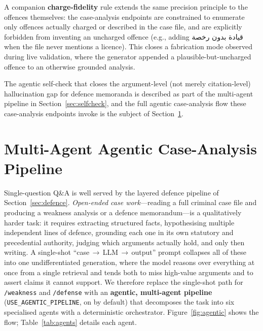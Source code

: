 \documentclass[final,1p,times]{elsarticle}
\newcommand{\ar}[1]{{\arabicfont\beginR #1\endR}}
\begin{document}
A companion \textbf{charge-fidelity} rule extends the same precision
principle to the offences themselves: the case-analysis endpoints are
constrained to enumerate only offences actually charged or described in the
case file, and are explicitly forbidden from inventing an uncharged offence
(e.g., adding \ar{قيادة بدون رخصة} when the file never mentions a licence).
This closes a fabrication mode observed during live validation, where the
generator appended a plausible-but-uncharged offence to an otherwise
grounded analysis.

The agentic self-check that closes the argument-level (not merely
citation-level) hallucination gap for defence memoranda is described as part of
the multi-agent pipeline in Section~\ref{sec:selfcheck}, and the full agentic
case-analysis flow these case-analysis endpoints invoke is the subject of
Section~\ref{sec:agentic}.

\section{Multi-Agent Agentic Case-Analysis Pipeline}\label{sec:agentic}

Single-question Q\&A is well served by the layered defence pipeline of
Section~\ref{sec:defence}. \emph{Open-ended case work}---reading a full criminal
case file and producing a weakness analysis or a defence memorandum---is a
qualitatively harder task: it requires extracting structured facts, hypothesising
multiple independent lines of defence, grounding each one in its own statutory and
precedential authority, judging which arguments actually hold, and only then
writing. A single-shot ``case\,$\rightarrow$\,LLM\,$\rightarrow$\,output'' prompt
collapses all of these into one undifferentiated generation, where the model
reasons over everything at once from a single retrieval and tends both to miss
high-value arguments and to assert claims it cannot support. We therefore replace
the single-shot path for \texttt{/weakness} and \texttt{/defense} with an
\textbf{agentic, multi-agent pipeline} (\texttt{USE\_AGENTIC\_PIPELINE}, on by
default) that decomposes the task into six specialised agents with a deterministic
orchestrator. Figure~\ref{fig:agentic} shows the flow; Table~\ref{tab:agents}
details each agent.
\end{document}
